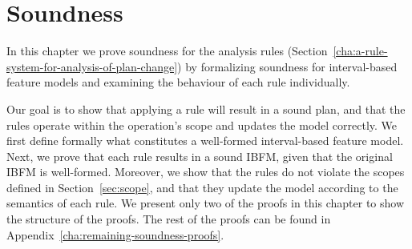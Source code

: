 \chapter{Soundness}
\label{cha:soundness}

In this chapter we prove soundness for the analysis rules (Section~\vref{cha:a-rule-system-for-analysis-of-plan-change}) by formalizing soundness for interval-based feature models and examining the behaviour of each rule individually.

Our goal is to show that applying a rule will result in a sound plan, and that the rules operate within the operation's scope and updates the model correctly. We first define formally what constitutes a well-formed interval-based feature model. Next, we prove that each rule results in a sound IBFM, given that the original IBFM is well-formed. Moreover, we show that the rules do not violate the scopes defined in Section~\ref{sec:scope}, and that they update the model according to the semantics of each rule. We present only two of the proofs in this chapter to show the structure of the proofs. The rest of the proofs can be found in Appendix~\vref{cha:remaining-soundness-proofs}.








